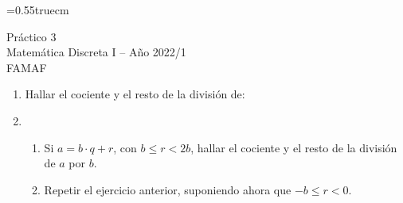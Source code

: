 \documentclass[a4paper,12pt,twoside,spanish,reqno]{amsbook}
\numberwithin{equation}{section}
\begin{document}
    \baselineskip=0.55truecm %

{\bf \begin{center}\large  Práctico 3 \\ Matemática Discreta I -- Año 2022/1 \\ FAMAF \end{center}}



\begin{enumerate}
\setlength\itemsep{1.1em}


\item Hallar el cociente y el resto de la división de:

\item 
    \begin{enumerate}
        \item Si $a=b\cdot q+r$, con $b \le r <2 b$, hallar el cociente y el resto de la división de $a$ por $b$.
        \item Repetir el ejercicio anterior, suponiendo ahora que $-b \le r < 0$.
    \end{enumerate}



\end{enumerate}
\end{document}

